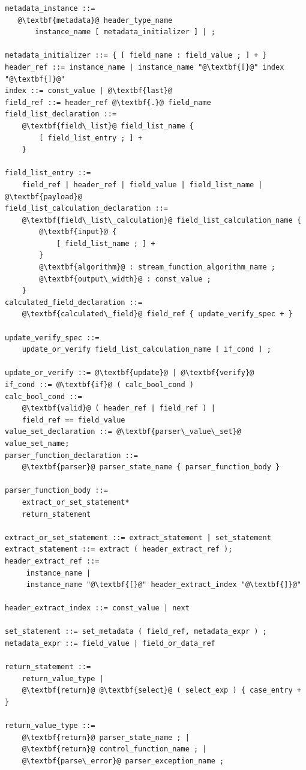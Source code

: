 \documentclass[12pt]{article}
\begin{document}
\begin{lstlisting}[frame=single,backgroundcolor=\color{bnfgreen},escapechar=\@]
metadata_instance ::= 
   @\textbf{metadata}@ header_type_name
       instance_name [ metadata_initializer ] | ;

metadata_initializer ::= { [ field_name : field_value ; ] + }
header_ref ::= instance_name | instance_name "@\textbf{[}@" index "@\textbf{]}@"
index ::= const_value | @\textbf{last}@
field_ref ::= header_ref @\textbf{.}@ field_name
field_list_declaration ::=
    @\textbf{field\_list}@ field_list_name {
        [ field_list_entry ; ] +
    }

field_list_entry ::= 
    field_ref | header_ref | field_value | field_list_name | @\textbf{payload}@
field_list_calculation_declaration ::=
    @\textbf{field\_list\_calculation}@ field_list_calculation_name {
        @\textbf{input}@ {
            [ field_list_name ; ] +
        }
        @\textbf{algorithm}@ : stream_function_algorithm_name ;
        @\textbf{output\_width}@ : const_value ;
    }
calculated_field_declaration ::=
    @\textbf{calculated\_field}@ field_ref { update_verify_spec + }

update_verify_spec ::=
    update_or_verify field_list_calculation_name [ if_cond ] ;

update_or_verify ::= @\textbf{update}@ | @\textbf{verify}@
if_cond ::= @\textbf{if}@ ( calc_bool_cond )
calc_bool_cond ::=
    @\textbf{valid}@ ( header_ref | field_ref ) |
    field_ref == field_value
value_set_declaration ::= @\textbf{parser\_value\_set}@ value_set_name;
parser_function_declaration ::=
    @\textbf{parser}@ parser_state_name { parser_function_body }

parser_function_body ::=
    extract_or_set_statement*
    return_statement

extract_or_set_statement ::= extract_statement | set_statement
extract_statement ::= extract ( header_extract_ref ); 
header_extract_ref ::=
     instance_name |
     instance_name "@\textbf{[}@" header_extract_index "@\textbf{]}@"

header_extract_index ::= const_value | next

set_statement ::= set_metadata ( field_ref, metadata_expr ) ;
metadata_expr ::= field_value | field_or_data_ref

return_statement ::=
    return_value_type |
    @\textbf{return}@ @\textbf{select}@ ( select_exp ) { case_entry + }

return_value_type ::= 
    @\textbf{return}@ parser_state_name ; | 
    @\textbf{return}@ control_function_name ; | 
    @\textbf{parse\_error}@ parser_exception_name ;


\end{lstlisting}
\end{document}
